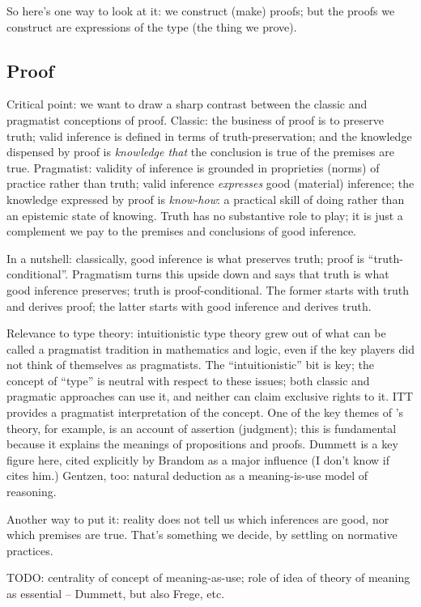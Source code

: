 So here's one way to look at it: we construct (make) proofs; but the
proofs we construct are expressions of the type (the thing we prove).

\subsection{Proof}
\label{subs:proof}

\begin{ednote}
  Critical point: we want to draw a sharp contrast between the classic
  and pragmatist conceptions of proof.  Classic: the business of proof
  is to preserve truth; valid inference is defined in terms of
  truth-preservation; and the knowledge dispensed by proof is
  \emph{knowledge that} the conclusion is true of the premises are
  true.  Pragmatist: validity of inference is grounded in proprieties
  (norms) of practice rather than truth; valid inference
  \emph{expresses} good (material) inference; the knowledge expressed
  by proof is \emph{know-how}: a practical skill of doing rather than
  an epistemic state of knowing.  Truth has no substantive role to
  play; it is just a complement we pay to the premises and conclusions
  of good inference.

  In a nutshell: classically, good inference is what preserves truth;
  proof is ``truth-conditional''.  Pragmatism turns this upside down
  and says that truth is what good inference preserves; truth is
  proof-conditional.  The former starts with truth and derives proof;
  the latter starts with good inference and derives truth.

  Relevance to type theory: intuitionistic type theory grew out of
  what can be called a pragmatist tradition in mathematics and logic,
  even if the key players did not think of themselves as pragmatists.
  The ``intuitionistic'' bit is key; the concept of ``type'' is
  neutral with respect to these issues; both classic and pragmatic
  approaches can use it, and neither can claim exclusive rights to it.
  ITT provides a pragmatist interpretation of the concept.  One of the
  key themes of \ML{}'s theory, for example, is an account of
  assertion (judgment); this is fundamental because it explains the
  meanings of propositions and proofs.  Dummett is a key figure here,
  cited explicitly by Brandom as a major influence (I don't know if
  \ML{} cites him.)  Gentzen, too: natural deduction as a
  meaning-is-use model of reasoning.

  Another way to put it: reality does not tell us which inferences are
  good, nor which premises are true.  That's something we decide, by
  settling on normative practices.

  TODO: centrality of concept of meaning-as-use; role of idea of
  theory of meaning as essential -- Dummett, but also Frege, etc.

\end{ednote}

